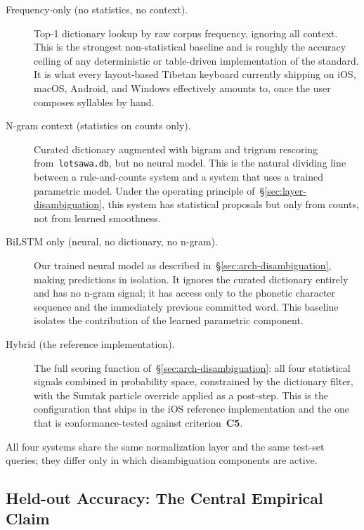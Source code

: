 \documentclass[11pt]{article}
\begin{document}
\begin{description}
\item[Frequency-only (no statistics, no context).] Top-1 dictionary lookup by raw corpus frequency, ignoring all context. This is the strongest non-statistical baseline and is roughly the accuracy ceiling of any deterministic or table-driven implementation of the standard. It is what every layout-based Tibetan keyboard currently shipping on iOS, macOS, Android, and Windows effectively amounts to, once the user composes syllables by hand.
\item[N-gram context (statistics on counts only).] Curated dictionary augmented with bigram and trigram rescoring from~\texttt{lotsawa.db}, but no neural model. This is the natural dividing line between a rule-and-counts system and a system that uses a trained parametric model. Under the operating principle of~\S\ref{sec:layer-disambiguation}, this system has statistical proposals but only from counts, not from learned smoothness.
\item[BiLSTM only (neural, no dictionary, no n-gram).] Our trained neural model as described in~\S\ref{sec:arch-disambiguation}, making predictions in isolation. It ignores the curated dictionary entirely and has no n-gram signal; it has access only to the phonetic character sequence and the immediately previous committed word. This baseline isolates the contribution of the learned parametric component.
\item[Hybrid (the reference implementation).] The full scoring function of~\S\ref{sec:arch-disambiguation}: all four statistical signals combined in probability space, constrained by the dictionary filter, with the Sumtak particle override applied as a post-step. This is the configuration that ships in the iOS reference implementation and the one that is conformance-tested against criterion~\textbf{C5}.
\end{description}

All four systems share the same normalization layer and the same test-set queries; they differ only in which disambiguation components are active.

\subsection{Held-out Accuracy: The Central Empirical Claim}
\end{document}
